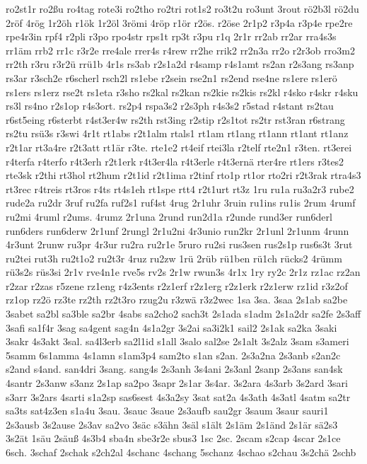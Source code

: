{ro2st1r
ro2ßu
ro4tag
rote3i
ro2tho
ro2tri
rot1s2
ro3t2u
ro3unt
3rout
rö2b3l
rö2du
2röf
4rög
1r2öh
r1ök
1r2öl
3römi
4röp
r1ör
r2ös.
r2öse
2r1p2
r3p4a
r3p4e
rpe2re
rpe4r3in
rpf4
r2pli
r3po
rpo4str
rps1t
rp3t
r3pu
r1q
2r1r
rr2ab
rr2ar
rra4s3s
rr1äm
rrb2
rr1c
r3r2e
rre4ale
rrer4s
r4rew
rr2he
rrik2
rr2n3a
rr2o
r2r3ob
rro3m2
rr2th
r3ru
r3r2ü
rrü1b
4r1s
rs3ab
r2s1a2d
r4samp
r4s1amt
rs2an
r2s3ang
rs3anp
rs3ar
r3sch2e
r6scherl
rsch2l
rs1ebe
r2sein
rse2n1
rs2end
rse4ne
rs1ere
rs1erö
rs1ers
rs1erz
rse2t
rs1eta
r3sho
rs2kal
rs2kan
rs2kie
rs2kis
rs2kl
r4sko
r4skr
r4sku
rs3l
rs4no
r2s1op
r4s3ort.
rs2p4
rspa3s2
r2s3ph
r4s3s2
r5stad
r4stant
rs2tau
r6st5eing
r6sterbt
r4st3er4w
rs2th
rst3ing
r2stip
r2s1tot
rs2tr
rst3ran
r6strang
rs2tu
rsü3s
r3swi
4r1t
rt1abs
r2t1alm
rtals1
rt1am
rt1ang
rt1ann
rt1ant
rt1anz
r2t1ar
rt3a4re
r2t3att
rt1är
r3te.
rte1e2
rt4eif
rtei3la
r2telf
rte2n1
r3ten.
rt3erei
r4terfa
r4terfo
r4t3erh
r2t1erk
r4t3er4la
r4t3erle
r4t3ernä
rter4re
rt1ers
r3tes2
rte3sk
r2thi
rt3hol
rt2hum
r2t1id
r2t1ima
r2tinf
rto1p
rt1or
rto2ri
r2t3rak
rtra4s3
rt3rec
r4treis
rt3ros
r4ts
rt4s1eh
rt1spe
rtt4
r2t1urt
rt3z
1ru
ru1a
ru3a2r3
rube2
rude2a
ru2dr
3ruf
ru2fa
ruf2s1
ruf4st
4rug
2r1uhr
3ruin
ru1ins
ru1is
2rum
4rumf
ru2mi
4ruml
r2ums.
4rumz
2r1una
2rund
run2d1a
r2unde
rund3er
run6derl
run6ders
run6derw
2r1unf
2rungl
2r1u2ni
4r3unio
run2kr
2r1unl
2r1unm
4runn
4r3unt
2runw
ru3pr
4r3ur
ru2ra
ru2r1e
5ruro
ru2si
rus3sen
rus2s1p
rus6s3t
3rut
ru2tei
rut3h
ru2t1o2
ru2t3r
4ruz
ru2zw
1rü
2rüb
rü1ben
rü1ch
rücks2
4rümm
rü3s2s
rüs3si
2r1v
rve4n1e
rve5s
rv2s
2r1w
rwun3s
4r1x
1ry
ry2c
2r1z
rz1ac
rz2an
r2zar
r2zas
r5zene
rz1eng
r4z3ents
r2z1erf
r2z1erg
r2z1erk
r2z1erw
rz1id
r3z2of
rz1op
rz2ö
rz3te
rz2th
rz2t3ro
rzug2u
r3zwä
r3z2wec
1sa
3sa.
3saa
2s1ab
sa2be
3sabet
sa2bl
sa3ble
sa2br
4sabs
sa2cho2
sach3t
2s1ada
s1adm
2s1a2dr
sa2fe
2s3aff
3safi
sa1f4r
3sag
sa4gent
sag4n
4s1a2gr
3s2ai
sa3i2k1
sail2
2s1ak
sa2ka
3saki
3sakr
4s3akt
3sal.
sa4l3erb
sa2l1id
s1all
3salo
sal2se
2s1alt
3s2alz
3sam
s3ameri
5samm
6s1amma
4s1amn
s1am3p4
sam2to
s1an
s2an.
2s3a2na
2s3anb
s2an2c
s2and
s4and.
san4dri
3sang.
sang4s
2s3anh
3s4ani
2s3anl
2sanp
2s3ans
san4sk
4santr
2s3anw
s3anz
2s1ap
sa2po
3sapr
2s1ar
3s4ar.
3s2ara
4s3arb
3s2ard
3sari
s3arr
3s2ars
4sarti
s1a2sp
sas6sest
4s3a2sy
3sat
sat2a
4s3ath
4s3atl
4satm
sa2tr
sa3ts
sat4z3en
s1a4u
3sau.
3sauc
3saue
2s3aufb
sau2gr
3saum
3saur
sauri1
2s3ausb
3s2ause
2s3av
sa2vo
3säc
s3ähn
3säl
s1ält
2s1äm
2s1änd
2s1är
sä2s3
3s2ät
1säu
2säuß
4s3b4
sba4n
sbe3r2e
sbus3
1sc
2sc.
2scam
s2cap
4scar
2s1ce
6sch.
3schaf
2schak
s2ch2al
4schanc
4schang
5schanz
4schao
s2chau
3s2chä
2schb
}
